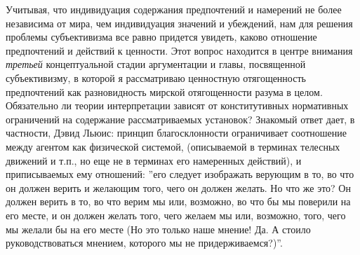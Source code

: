 \documentclass[11pt]{book}
\begin{document}
Учитывая, что индивидуация содержания предпочтений и намерений не более независима от мира, чем индивидуация значений и убеждений, нам для решения проблемы субъективизма все равно придется увидеть, каково отношение предпочтений и действий к ценности. Этот вопрос находится в центре внимания \textit{третьей} концептуальной стадии аргументации и главы, посвященной субъективизму, в которой я рассматриваю ценностную отягощенность предпочтений как разновидность мирской отягощенности разума в целом. Обязательно ли теории интерпретации зависят от конститутивных нормативных ограничений на содержание рассматриваемых установок? Знакомый ответ дает, в частности, Дэвид Льюис: принцип благосклонности ограничивает соотношение между агентом как физической системой, (описываемой в терминах телесных движений и т.п., но еще не в терминах его намеренных действий), и приписываемых ему отношений: ''его следует изображать верующим в то, во что он должен верить и желающим того, чего он должен желать. Но что же это? Он должен верить в то, во что верим мы или, возможно, во что бы мы поверили на его месте, и он должен желать того, чего желаем мы или, возможно, того, чего мы желали бы на его месте (Но это только наше мнение! Да. А стоило руководствоваться мнением, которого мы не придерживаемся?)''.
\end{document}
